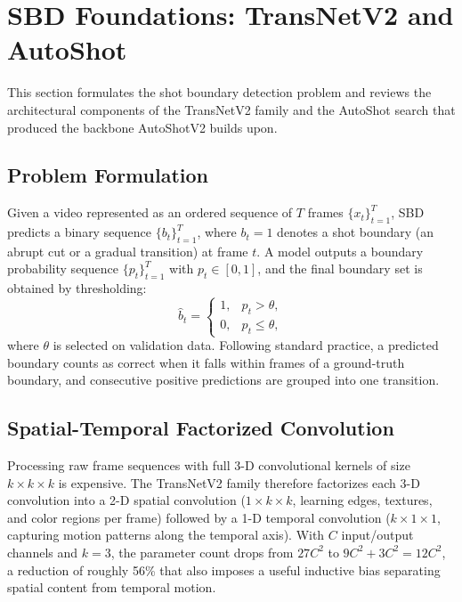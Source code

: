 \section{SBD Foundations: TransNetV2 and AutoShot}
\label{sec:foundation}

This section formulates the shot boundary detection problem and reviews the
architectural components of the TransNetV2 family and the AutoShot search
that produced the backbone AutoShotV2 builds upon.

\subsection{Problem Formulation}
\label{sec:problem}

Given a video represented as an ordered sequence of $T$ frames
$\{x_t\}_{t=1}^{T}$, SBD predicts a binary sequence $\{b_t\}_{t=1}^{T}$,
where $b_t{=}1$ denotes a shot boundary (an abrupt cut or a gradual
transition) at frame $t$. A model outputs a boundary probability sequence
$\{p_t\}_{t=1}^{T}$ with $p_t\in[0,1]$, and the final boundary set is
obtained by thresholding:
\begin{equation}
    \hat b_t=\begin{cases}1, & p_t > \theta,\\ 0, & p_t \le \theta,\end{cases}
    \label{eq:threshold}
\end{equation}
where $\theta$ is selected on validation data. Following standard practice,
a predicted boundary counts as correct when it falls within
\PaperMatchTolerance{} frames of a ground-truth boundary, and consecutive
positive predictions are grouped into one transition.

\subsection{Spatial-Temporal Factorized Convolution}

Processing raw frame sequences with full 3-D convolutional kernels of size
$k\times k\times k$ is expensive. The TransNetV2 family therefore factorizes
each 3-D convolution into a 2-D spatial convolution ($1\times k\times k$,
learning edges, textures, and color regions per frame) followed by a 1-D
temporal convolution ($k\times 1\times 1$, capturing motion patterns along
the temporal axis). With $C$ input/output channels and $k{=}3$, the
parameter count drops from $27C^2$ to $9C^2+3C^2=12C^2$, a reduction of
roughly 56\% that also imposes a useful inductive bias separating spatial
content from temporal motion.

